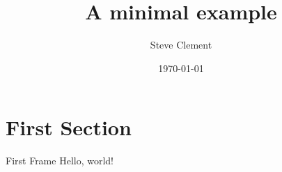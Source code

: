 \documentclass{beamer}
\title{A minimal example}
\date{\today}
\author{Steve Clement}
\institute{NC3 - The National Cybersecurity Competence Center}
\begin{document}
\maketitle
\section{First Section}
\begin{frame}{First Frame}
Hello, world!
\end{frame}
\end{document}
